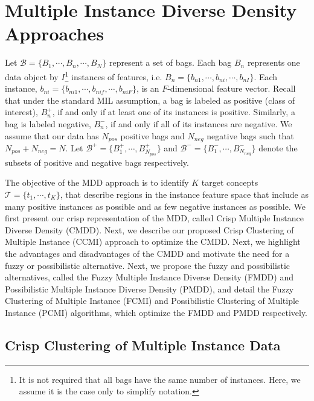 \documentclass[12pt,dvips]{report}
\numberwithin{equation}{section}
\begin{document}
\section{Multiple Instance Diverse Density Approaches}

Let $\mathcal{B}=\{B_{1}, \cdots, B_n, \cdots, B_{N}\}$ represent a set of bags.  Each bag $B_{n}$ represents one data object by $I$\footnote{It is not required that all bags have the same number of instances. Here, we assume it is the case only to simplify notation.} instances of features, i.e. $B_{n}=\{b_{n1}, \cdots, b_{ni}, \cdots, b_{nI}\}$.  Each instance, $b_{ni}=\{b_{ni1}, \cdots, b_{nif}, \cdots, b_{niF}\}$, is an $F$-dimensional feature vector.  Recall that under the standard MIL assumption, a  bag is labeled as positive (class of interest), $B_{n}^+$, if and only if at least one of its instances is positive. Similarly, a bag is labeled negative, $B_{n}^-$, if and only if all of its instances are negative. We assume that our data has $N_{pos}$ positive bags and $N_{neg}$ negative bags such that $N_{pos}+N_{neg}=N$. 
Let $\mathcal{B^+}=\{B^+_{1}, \cdots, B^+_{N_{pos}}\}$ and $\mathcal{B^-}=\{B^-_{1},  \cdots, B^-_{N_{neg}}\}$ denote the subsets of positive and negative bags respectively. 

The objective of the MDD approach is to identify $K$ target concepts $\mathcal{T}=\{t_{1}, \cdots, t_K\}$, that describe regions in the instance feature space that include as many positive instances as possible and as few negative instances as possible.  We first present our crisp representation of the MDD, called Crisp Multiple Instance Diverse Density (CMDD).  Next, we describe our proposed Crisp Clustering of Multiple Instance (CCMI) approach to optimize the CMDD.  Next, we highlight the advantages and disadvantages of the CMDD and motivate the need for a fuzzy or possibilistic alternative.  Next, we propose the fuzzy and possibilistic alternatives, called the Fuzzy Multiple Instance Diverse Density (FMDD) and Possibilistic Multiple Instance Diverse Density (PMDD), and detail the Fuzzy Clustering of Multiple Instance (FCMI) and Possibilistic Clustering of Multiple Instance (PCMI) algorithms, which optimize the FMDD and PMDD respectively.

\subsection{Crisp Clustering of Multiple Instance Data} \label{subsec:CCMI}
\end{document}
